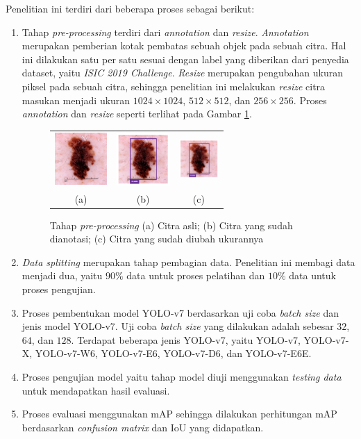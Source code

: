 Penelitian ini terdiri dari beberapa proses sebagai berikut:
\begin{enumerate}
    \item Tahap \textit{pre-processing} terdiri dari \textit{annotation} dan \textit{resize}. \textit{Annotation} merupakan pemberian kotak pembatas sebuah objek pada sebuah citra. Hal ini dilakukan satu per satu sesuai dengan label yang diberikan dari penyedia dataset, yaitu \textit{ISIC 2019 Challenge}. \textit{Resize} merupakan pengubahan ukuran piksel pada sebuah citra, sehingga penelitian ini melakukan \textit{resize} citra masukan menjadi ukuran $1024\times 1024$, $512\times 512$, dan $256\times 256$. Proses \textit{annotation} dan \textit{resize} seperti terlihat pada Gambar \ref{fig:preprocessing}.
    \begin{figure}[H]
        \centering
        \begin{tabular}{ccc}
            \includegraphics[width=2cm]{../img/Dermoscopy - Latex.jpg}
            &
            \includegraphics[width=2cm]{../img/Annotation - Latex.png}
            &
            \includegraphics[width=1.5cm]{../img/Annotation - Latex.png}\\
            (a) &(b) &(c)\\
        \end{tabular}
        \caption{Tahap \textit{pre-processing} (a) Citra asli; (b) Citra yang sudah dianotasi; (c) Citra yang sudah diubah ukurannya}
        \label{fig:preprocessing}
    \end{figure}

    \item \textit{Data splitting} merupakan tahap pembagian data. Penelitian ini membagi data menjadi dua, yaitu $90\%$ data untuk proses pelatihan dan $10\%$ data untuk proses pengujian.
    \item Proses pembentukan model YOLO-v7 berdasarkan uji coba \textit{batch size} dan jenis model YOLO-v7. Uji coba \textit{batch size} yang dilakukan adalah sebesar $32$, $64$, dan $128$. Terdapat beberapa jenis YOLO-v7, yaitu YOLO-v7, YOLO-v7-X, YOLO-v7-W6, YOLO-v7-E6, YOLO-v7-D6, dan YOLO-v7-E6E.
    \item Proses pengujian model yaitu tahap model diuji menggunakan \textit{testing data} untuk mendapatkan hasil evaluasi.
    \item Proses evaluasi menggunakan mAP sehingga dilakukan perhitungan mAP berdasarkan \textit{confusion matrix} dan IoU yang didapatkan.
\end{enumerate}

